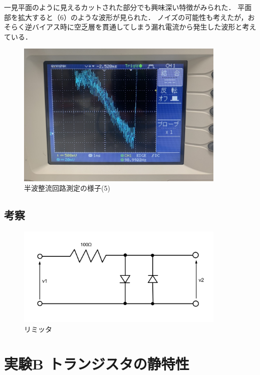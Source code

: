 \documentclass[titlepage]{jarticle}
\begin{document}
一見平面のように見えるカットされた部分でも興味深い特徴がみられた．
平面部を拡大すると（6）のような波形が見られた．
ノイズの可能性も考えたが，おそらく逆バイアス時に空乏層を貫通してしまう漏れ電流から発生した波形と考えている．

\begin{figure}[H]
    \begin{center}
        \includegraphics[width=10cm]{image/diode/S__19873801.jpg}
        \caption{半波整流回路測定の様子(5)}
        \label{fig:半波整流回路測定の様子(5)}
    \end{center}
\end{figure}


\subsection{考察}
\begin{figure}[H]
    \begin{center}
        \includegraphics[width=10cm]{image/limmit.jpg}
        \caption{リミッタ}
        \label{fig:リミッタ}
    \end{center}
\end{figure}


\newpage
\section{実験B トランジスタの静特性}
\end{document}
